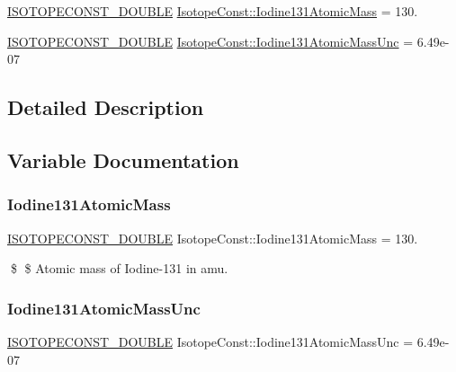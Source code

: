 \begin{DoxyCompactItemize}
\item 
\mbox{\hyperlink{group___isotope_const-_macros_ga8f45a7272ce02c0b4c65c44636ed719a}{I\+S\+O\+T\+O\+P\+E\+C\+O\+N\+S\+T\+\_\+\+D\+O\+U\+B\+LE}} \mbox{\hyperlink{group___isotope_const-_iodine-_i131_ga8cc2506aa77f017e0b8caeb44938a32c}{Isotope\+Const\+::\+Iodine131\+Atomic\+Mass}} = 130.
\item 
\mbox{\hyperlink{group___isotope_const-_macros_ga8f45a7272ce02c0b4c65c44636ed719a}{I\+S\+O\+T\+O\+P\+E\+C\+O\+N\+S\+T\+\_\+\+D\+O\+U\+B\+LE}} \mbox{\hyperlink{group___isotope_const-_iodine-_i131_gaba9ec7b55c193cfd083df9fb3c9042ad}{Isotope\+Const\+::\+Iodine131\+Atomic\+Mass\+Unc}} = 6.\+49e-\/07
\end{DoxyCompactItemize}


\subsection{Detailed Description}


\subsection{Variable Documentation}
\mbox{\label{group___isotope_const-_iodine-_i131_ga8cc2506aa77f017e0b8caeb44938a32c}} 
\subsubsection{\texorpdfstring{Iodine131\+Atomic\+Mass}{Iodine131AtomicMass}}
{\footnotesize\ttfamily \mbox{\hyperlink{group___isotope_const-_macros_ga8f45a7272ce02c0b4c65c44636ed719a}{I\+S\+O\+T\+O\+P\+E\+C\+O\+N\+S\+T\+\_\+\+D\+O\+U\+B\+LE}} Isotope\+Const\+::\+Iodine131\+Atomic\+Mass = 130.}

\$ \$ Atomic mass of Iodine-\/131 in amu. \mbox{\label{group___isotope_const-_iodine-_i131_gaba9ec7b55c193cfd083df9fb3c9042ad}} 
\subsubsection{\texorpdfstring{Iodine131\+Atomic\+Mass\+Unc}{Iodine131AtomicMassUnc}}
{\footnotesize\ttfamily \mbox{\hyperlink{group___isotope_const-_macros_ga8f45a7272ce02c0b4c65c44636ed719a}{I\+S\+O\+T\+O\+P\+E\+C\+O\+N\+S\+T\+\_\+\+D\+O\+U\+B\+LE}} Isotope\+Const\+::\+Iodine131\+Atomic\+Mass\+Unc = 6.\+49e-\/07}

